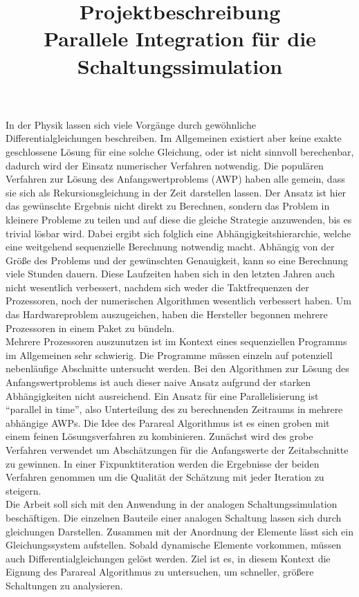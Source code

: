 \documentclass[12pt,a4paper]{article}
\title{Projektbeschreibung\\
    \large Parallele Integration für die Schaltungssimulation}
\author{}
\date{}
\begin{document}
\maketitle

In der Physik lassen sich viele Vorgänge durch gewöhnliche Differentialgleichungen beschreiben. Im Allgemeinen existiert aber keine exakte geschlossene Lösung für eine solche Gleichung, oder ist nicht sinnvoll berechenbar, dadurch wird der Einsatz numerischer Verfahren notwendig. Die populären Verfahren zur Lösung des Anfangswertproblems (AWP) haben alle gemein, dass sie sich als Rekursionsgleichung in der Zeit darstellen lassen. Der Ansatz ist hier das gewünschte Ergebnis nicht direkt zu Berechnen, sondern das Problem in kleinere Probleme zu teilen und auf diese die gleiche Strategie anzuwenden, bis es trivial lösbar wird. Dabei ergibt sich folglich eine Abhängigkeitshierarchie, welche eine weitgehend sequenzielle Berechnung notwendig macht. Abhängig von der Größe des Problems und der gewünschten Genauigkeit, kann so eine Berechnung viele Stunden dauern. Diese Laufzeiten haben sich in den letzten Jahren auch nicht wesentlich verbessert, nachdem sich weder die Taktfrequenzen der Prozessoren, noch der numerischen Algorithmen wesentlich verbessert haben. Um das Hardwareproblem auszugeichen, haben die Hersteller begonnen mehrere Prozessoren in einem Paket zu bündeln.\\
Mehrere Prozessoren auszunutzen ist im Kontext eines sequenziellen Programms im Allgemeinen sehr schwierig. Die Programme müssen einzeln auf potenziell nebenläufige Abschnitte untersucht werden. Bei den Algorithmen zur Lösung des Anfangswertproblems ist auch dieser naive Ansatz aufgrund der starken Abhängigkeiten nicht ausreichend. Ein Ansatz für eine Parallelisierung ist "`parallel in time"', also Unterteilung des zu berechnenden Zeitraums in mehrere abhängige AWPs. Die Idee des Parareal Algorithmus ist es einen groben mit einem feinen Lösungsverfahren zu kombinieren. Zunächst wird des grobe Verfahren verwendet um Abschätzungen für die Anfangswerte der Zeitabschnitte zu gewinnen. In einer Fixpunktiteration werden die Ergebnisse der beiden Verfahren genommen um die Qualität der Schätzung mit jeder Iteration zu steigern.\\
Die Arbeit soll sich mit den Anwendung in der analogen Schaltungssimulation beschäftigen. Die einzelnen Bauteile einer analogen Schaltung lassen sich durch gleichungen Darstellen. Zusammen mit der Anordnung der Elemente lässt sich ein Gleichungssystem aufstellen. Sobald dynamische Elemente vorkommen, müssen auch Differentialgleichungen gelöst werden. Ziel ist es, in diesem Kontext die Eignung des Parareal Algorithmus zu untersuchen, um schneller, größere Schaltungen zu analysieren.
\end{document}
